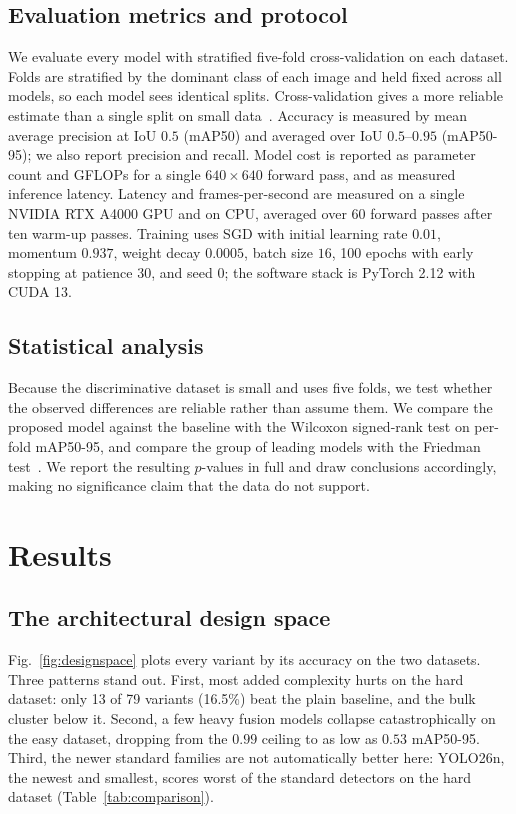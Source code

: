 \documentclass[preprint,review,12pt]{elsarticle}
\begin{document}
\subsection{Evaluation metrics and protocol}
We evaluate every model with stratified five-fold cross-validation on each
dataset. Folds are stratified by the dominant class of each image and held fixed
across all models, so each model sees identical splits. Cross-validation gives a
more reliable estimate than a single split on small
data~\cite{kohavi1995study}. Accuracy is measured by mean average precision at
IoU $0.5$ (mAP50) and averaged over IoU $0.5$--$0.95$ (mAP50-95); we also report
precision and recall. Model cost is reported as parameter count and GFLOPs for a
single $640\times640$ forward pass, and as measured inference latency. Latency
and frames-per-second are measured on a single NVIDIA RTX A4000 GPU and on CPU,
averaged over 60 forward passes after ten warm-up passes. Training uses SGD with
initial learning rate $0.01$, momentum $0.937$, weight decay $0.0005$, batch size
$16$, 100 epochs with early stopping at patience $30$, and seed $0$; the software
stack is PyTorch 2.12 with CUDA 13.

\subsection{Statistical analysis}
Because the discriminative dataset is small and uses five folds, we test whether
the observed differences are reliable rather than assume them. We compare the
proposed model against the baseline with the Wilcoxon signed-rank test on
per-fold mAP50-95, and compare the group of leading models with the Friedman
test~\cite{demsar2006statistical}. We report the resulting $p$-values in full and
draw conclusions accordingly, making no significance claim that the data do not
support.

\section{Results}

\subsection{The architectural design space}
\label{sec:search}
Fig.~\ref{fig:designspace} plots every variant by its accuracy on the two
datasets. Three patterns stand out. First, most added complexity hurts on the
hard dataset: only 13 of 79 variants (16.5\%) beat the plain baseline, and the
bulk cluster below it. Second, a few heavy fusion models collapse
catastrophically on the easy dataset, dropping from the $0.99$ ceiling to as low
as $0.53$ mAP50-95. Third, the newer standard families are not automatically
better here: YOLO26n, the newest and smallest, scores worst of the standard
detectors on the hard dataset (Table~\ref{tab:comparison}).
\end{document}
